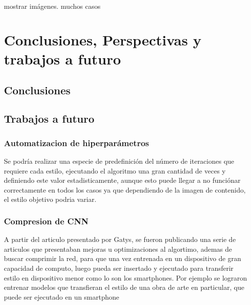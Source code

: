 \documentclass[a4paper,11pt,spanish]{book}
\begin{document}
mostrar imágenes. muchos casos


\chapter{Conclusiones, Perspectivas y trabajos a futuro}
  \section{Conclusiones}
  \section{Trabajos a futuro}
    \subsection{Automatizacion de hiperparámetros}
      Se podría realizar una especie de predefinición del número de iteraciones que requiere cada estilo, ejecutando el algoritmo una gran cantidad de veces y definiendo este valor
      estadisticamente, aunque esto puede llegar a no funciónar correctamente en todos los casos ya que dependiendo de la imagen de contenido, el estilo objetivo podria variar.
    \subsection{Compresion de CNN}
      A partir del articulo presentado por Gatys, se fueron publicando una serie de articulos que presentaban mejoras u optimizaciones al algortimo, ademas de buscar comprimir la red,
      para que una vez entrenada en un dispositivo de gran capacidad de computo, luego pueda ser insertado y ejecutado para transferir estilo en dispositivo menor como lo son los smartphones.
      Por ejemplo se lograron entrenar modelos que transfieran el estilo de una obra de arte en particular, que puede ser ejecutado en un smartphone
\printindex

\end{document}
